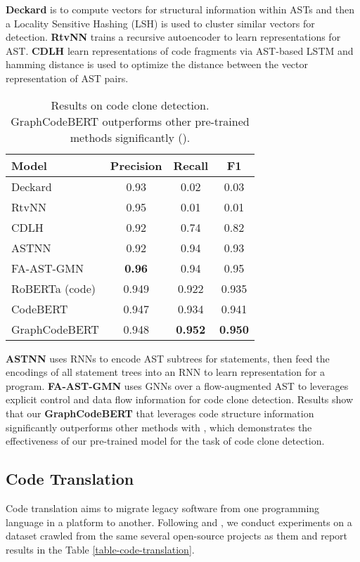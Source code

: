 \documentclass{article} \usepackage{iclr2021_conference,times}
\begin{document}
\textbf{Deckard}  \citep{jiang2007deckard} is to compute vectors for structural information within ASTs and then a Locality Sensitive Hashing (LSH) \citep{datar2004locality} is used to cluster similar vectors for detection.
\textbf{RtvNN} \citep{white2016deep} trains a recursive autoencoder to learn representations for AST. 
\textbf{CDLH} \citep{wei2017supervised} learn representations of code fragments via AST-based LSTM and 
hamming distance is used to optimize the distance between the vector representation of AST pairs. 
\begin{wraptable}{r}{7.2cm}
\centering
\small
		\begin{tabular}{l|c|c|c}
			\hline 
			Model & Precision & Recall & F1 \\
\hline 
			Deckard&0.93&0.02&0.03\\
			RtvNN&0.95&0.01&0.01\\
			CDLH&0.92&0.74&0.82\\
			ASTNN&0.92&0.94&0.93\\
			FA-AST-GMN&{\bf0.96}&0.94&0.95\\
			\hline 
RoBERTa (code)&0.949&0.922&0.935 \\
CodeBERT&0.947&0.934&0.941 \\
GraphCodeBERT & 0.948&{\bf 0.952}&{\bf 0.950}\\
			\hline 
		\end{tabular}
	\caption{Results on code clone detection. GraphCodeBERT outperforms other pre-trained methods significantly ().}

	\label{table-code-clone-detection}

\end{wraptable}
\textbf{ASTNN} \cite{zhang2019novel} uses RNNs to encode AST subtrees for statements, then feed the encodings of all statement trees into an RNN to learn representation for a program.
\textbf{FA-AST-GMN} \citep{wang2020detecting} uses GNNs over a flow-augmented AST to leverages explicit control and data flow information for code clone detection.
Results show that our \textbf{GraphCodeBERT} that leverages code structure information significantly outperforms other methods with , which demonstrates the effectiveness of our pre-trained model for the task of code clone detection.


\subsection{Code Translation}\label{section:experiment-code translation}
Code translation aims to migrate legacy software from one programming language in a platform to another. Following \citet{nguyen2015divide} and \citet{chen2018tree}, we conduct experiments on a dataset crawled from the same several open-source projects as them and report results in the Table \ref{table-code-translation}.
\end{document}
